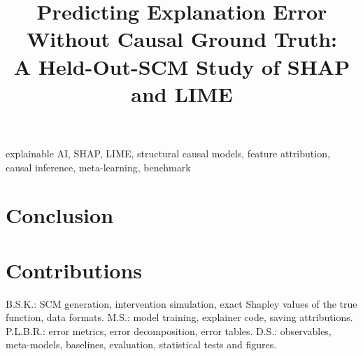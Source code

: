 \documentclass[conference]{IEEEtran}
\begin{document}
\title{Predicting Explanation Error Without Causal Ground Truth:\\A Held-Out-SCM Study of SHAP and LIME}

\author{
\and
{}
\and
{}
\and
{}
}

\maketitle

\begin{abstract}

\end{abstract}

\begin{IEEEkeywords}
explainable AI, SHAP, LIME, structural causal models, feature attribution, causal inference, meta-learning, benchmark
\end{IEEEkeywords}








\section{Conclusion}


\section*{Contributions}
B.S.K.: SCM generation, intervention simulation, exact Shapley values of the true function, data formats. M.S.: model training, explainer code, saving attributions. P.L.B.R.: error metrics, error decomposition, error tables. D.S.: observables, meta-models, baselines, evaluation, statistical tests and figures.
\end{document}
